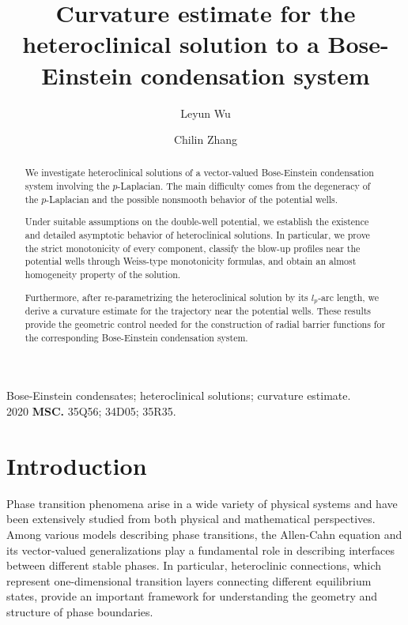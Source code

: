 \documentclass[11pt,twoside,reqno]{amsart}
\newcounter{assu}
\numberwithin{equation}{section}
\begin{document}
\begin{abstract}
We investigate heteroclinical solutions of a vector-valued Bose-Einstein condensation system involving the $p$-Laplacian. The main difficulty comes from the degeneracy of the $p$-Laplacian and the possible nonsmooth behavior of the potential wells.

Under suitable assumptions on the double-well potential, we establish the existence and detailed asymptotic behavior of heteroclinical solutions. In particular, we prove the strict monotonicity of every component, classify the blow-up profiles near the potential wells through Weiss-type monotonicity formulas, and obtain an almost homogeneity property of the solution.

Furthermore, after re-parametrizing the heteroclinical solution by its $l_p$-arc length, we derive a curvature estimate for the trajectory near the potential wells. These results provide the geometric control needed for the construction of radial barrier functions for the corresponding Bose-Einstein condensation system.
\end{abstract}

\author{Leyun Wu}
\address{School of Mathematics, South China University of Technology, Guangzhou, 510640, P. R. China}
\author{Chilin Zhang}
\address{School of Mathematical Sciences, Fudan University, Shanghai 200433, P. R. China}

\title[Curvature estimate]{Curvature estimate for the heteroclinical solution to a Bose-Einstein condensation system}


\maketitle

\maketitle

 Bose-Einstein condensates; heteroclinical solutions; curvature estimate.\\
2020 {\bf MSC.} 35Q56; 34D05; 35R35.





\section{Introduction}
Phase transition phenomena arise in a wide variety of physical systems and have been extensively studied from both physical and mathematical perspectives. Among various models describing phase transitions, the Allen-Cahn equation and its vector-valued generalizations play a fundamental role in describing interfaces between different stable phases. In particular, heteroclinic connections, which represent one-dimensional transition layers connecting different equilibrium states, provide an important framework for understanding the geometry and structure of phase boundaries.
\end{document}
